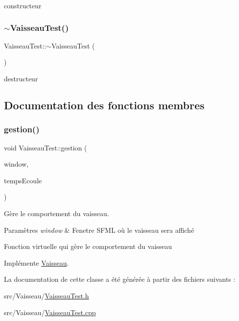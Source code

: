 constructeur 

\mbox{\label{class_vaisseau_test_ada9b5788bc092ecede953248cd6133e8}} 
\subsubsection{\texorpdfstring{$\sim$\+Vaisseau\+Test()}{~VaisseauTest()}}
{\footnotesize\ttfamily Vaisseau\+Test\+::$\sim$\+Vaisseau\+Test (\begin{DoxyParamCaption}{ }\end{DoxyParamCaption})}



destructeur 



\subsection{Documentation des fonctions membres}
\mbox{\label{class_vaisseau_test_a50009e27227a8e1c4d18c16bfba0a55f}} 
\subsubsection{\texorpdfstring{gestion()}{gestion()}}
{\footnotesize\ttfamily void Vaisseau\+Test\+::gestion (\begin{DoxyParamCaption}\item[{sf\+::\+Render\+Window \&}]{window,  }\item[{float}]{temps\+Ecoule }\end{DoxyParamCaption})\hspace{0.3cm}{\ttfamily [virtual]}}



Gère le comportement du vaisseau. 


\begin{DoxyParams}{Paramètres}
{\em window} & Fenetre S\+F\+ML où le vaisseau sera affiché\\
\hline
\end{DoxyParams}
Fonction virtuelle qui gère le comportement du vaisseau 

Implémente \hyperlink{class_vaisseau_a98c129568d478586684b1769fe465803}{Vaisseau}.



La documentation de cette classe a été générée à partir des fichiers suivants \+:\begin{DoxyCompactItemize}
\item 
src/\+Vaisseau/\hyperlink{_vaisseau_test_8h}{Vaisseau\+Test.\+h}\item 
src/\+Vaisseau/\hyperlink{_vaisseau_test_8cpp}{Vaisseau\+Test.\+cpp}\end{DoxyCompactItemize}
